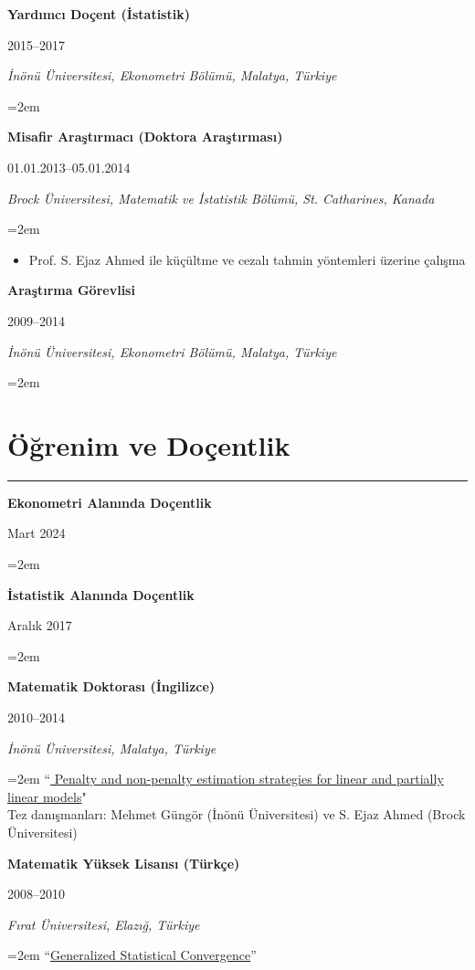 \documentclass[10pt,a4paper]{article}
\newcommand{\sepspace}{\vspace*{0.65em}}		%
\newcommand{\NewPart}[2]{%
	\Needspace{7\baselineskip}%
	\vspace{0.45em}%
	\section*{\sffamily\large\bfseries\color{MidnightBlue}#1 #2}%
	\vspace{-0.7em}\noindent\color{MidnightBlue}\rule{\textwidth}{0.55pt}\color{Black}\vspace{0.25em}}
\newcommand{\EducationEntry}[4]{
		\noindent \textbf{#1} \hfill      %
		\parbox{11.5em}{%
			\hfill\color{Black}#2} \par  %
		\noindent \textit{#3} \par        %
		\noindent\hangindent=2em\hangafter=0 \small #4 %
		\normalsize \par}
\begin{document}



\sepspace
\EducationEntry{Yardımcı Doçent (İstatistik)}{2015--2017}{İnönü Üniversitesi, Ekonometri Bölümü, Malatya, Türkiye}{}


\sepspace
\EducationEntry{Misafir Araştırmacı (Doktora Araştırması)}{01.01.2013--05.01.2014}{Brock Üniversitesi, Matematik ve İstatistik Bölümü, St. Catharines, Kanada}
{\begin{itemize}\item{Prof. S. Ejaz Ahmed ile küçültme ve cezalı tahmin yöntemleri üzerine çalışma}\end{itemize}}


\sepspace
\EducationEntry{Araştırma Görevlisi}{2009--2014}{İnönü Üniversitesi, Ekonometri Bölümü, Malatya, Türkiye}{}



\NewPart{Öğrenim ve Doçentlik}{}

\EducationEntry{Ekonometri Alanında Doçentlik}{Mart 2024}{}{}

\EducationEntry{İstatistik Alanında Doçentlik}{Aralık 2017}{}{}


\EducationEntry{Matematik Doktorası (İngilizce)}{2010--2014}{İnönü Üniversitesi, Malatya, Türkiye}{
{``\href{http://openaccess.inonu.edu.tr:8080/xmlui/handle/11616/5947?locale-attribute=en}{
Penalty and non-penalty estimation strategies for linear and partially linear models}"}\\
Tez danışmanları: Mehmet Güngör (İnönü Üniversitesi) ve S. Ejaz Ahmed (Brock Üniversitesi)}





\sepspace
\EducationEntry{Matematik Yüksek Lisansı (Türkçe)}{2008--2010}{Fırat Üniversitesi, Elazığ, Türkiye}{{``\href{https://openaccess.firat.edu.tr/xmlui/handle/11508/17055?locale-attribute=en}{Generalized Statistical Convergence}''}
}
\end{document}
